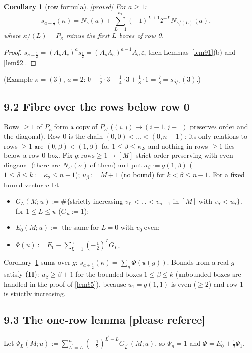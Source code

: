 \documentclass[10pt]{amsart}
\newcommand{\grade}[1]{\textsf{[#1]}}
\newcommand{\pr}{^{\prime}}
\newtheorem{cor}[lem]{Corollary}
\theoremstyle{remark}
\begin{document}
\begin{cor}[row formula]\label{cor93}\grade{proved}
For $a\ge1$: \[s_{a+\frac12}(\kappa)=N_\kappa(a)+\sum_{L=1}^{\kappa_1}(-1)^{L+1}2^{-L}N_{\kappa/(L)}(a),\]
where $\kappa/(L)=P_\kappa$ minus the first $L$ boxes of row 0.
\end{cor}
\begin{proof}
$s_{a+\frac12}=(A_oA_e)^as_{\frac12}=(A_oA_e)^{a-1}A_o\,\varepsilon$, then Lemmas~\ref{lem91}(b) and \ref{lem92}.
\end{proof}
(Example $\kappa=(3)$, $a=2$: $0+\tfrac12\cdot3-\tfrac14\cdot3+\tfrac18\cdot1=\tfrac78=s_{5/2}(3)$.)

\subsection*{9.2 Fibre over the rows below row 0}

Rows $\ge1$ of $P_\kappa$ form a copy of $P_{\kappa\pr}$ ($(i,j)\mapsto(i-1,j-1)$ preserves order and the diagonal). Row 0 is
the chain $(0,0)<\dots<(0,n-1)$; its only relations to rows $\ge1$ are $(0,\beta)<(1,\beta)$ for $1\le\beta\le\kappa_2$, and
nothing in rows $\ge1$ lies below a row-0 box. Fix $g:\text{rows}\ge1\to[M]$ strict order-preserving with even diagonal
(there are $N_{\kappa\pr}(a)$ of them) and put $u_\beta:=g(1,\beta)$ ($1\le\beta\le k:=\kappa_2\le n-1$); $u_\beta:=M+1$ (no
bound) for $k<\beta\le n-1$. For a fixed bound vector $u$ let
\begin{itemize}
\item $G_L(M;u):=\#\{$strictly increasing $v_L<\dots<v_{n-1}$ in $[M]$ with $v_\beta<u_\beta\}$, for $1\le L\le n$
($G_n:=1$);
\item $E_0(M;u):=$ the same for $L=0$ with $v_0$ even;
\item $\Phi(u):=E_0-\sum_{L=1}^{n}(-\tfrac12)^LG_L$.
\end{itemize}
Corollary~\ref{cor93} sums over $g$: $\boxed{s_{a+\frac12}(\kappa)=\sum_g\Phi(u(g))}$. Bounds from a real $g$ satisfy
\textbf{(H)}: $u_\beta\ge\beta+1$ for the bounded boxes $1\le\beta\le k$ (unbounded boxes are handled in the proof of
\ref{lem95}), because $u_1=g(1,1)$ is even ($\ge2$) and row 1 is strictly increasing.

\subsection*{9.3 The one-row lemma \quad\textbf{[please referee]}}

Let $\Psi_L(M;u):=\sum_{L\pr=L}^{n}(-\tfrac12)^{L\pr-L}G_{L\pr}(M;u)$, so $\Psi_n=1$ and $\Phi=E_0+\tfrac12\Psi_1$.
\end{document}
